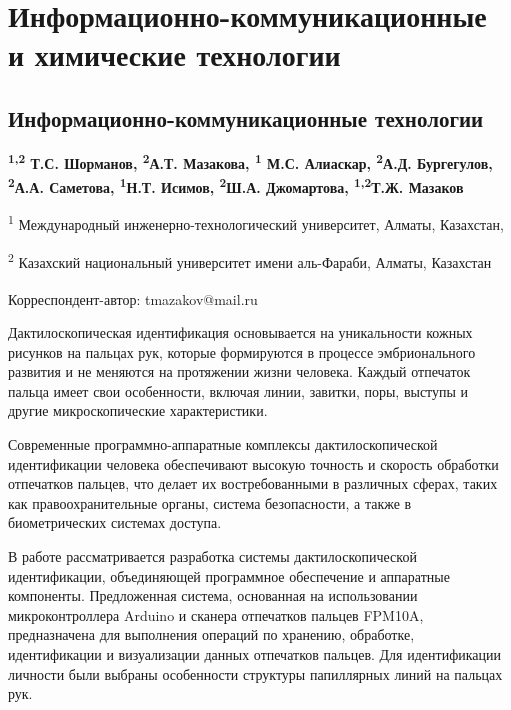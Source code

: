 \newpage
\let\cleardoublepage\clearpage
\part{Информационно-коммуникационные и химические технологии}
\chapter{Информационно-коммуникационные технологии}

\begin{articleheader}

{\bfseries \textsuperscript{1,2}
Т.С. Шорманов, \textsuperscript{2}А.Т.  Мазакова, \textsuperscript{1}
М.С. Алиаскар, \textsuperscript{2}А.Д.
Бургегулов, \textsuperscript{2}А.А. Саметова, \textsuperscript{1}Н.Т. Исимов, \textsuperscript{2}Ш.А.
Джомартова, \textsuperscript{1,2}Т.Ж. Мазаков\textsuperscript{\envelope }}
\end{articleheader}

\begin{affiliation}
\textsuperscript{1} Международный инженерно-технологический университет,
Алматы, Казахстан,

\textsuperscript{2} Казахский национальный университет имени аль-Фараби,
Алматы, Казахстан

\raggedright {\bfseries \textsuperscript{\envelope }}Корреспондент-автор: tmazakov@mail.ru
\end{affiliation}

Дактилоскопическая идентификация основывается на уникальности кожных
рисунков на пальцах рук, которые формируются в процессе эмбрионального
развития и не меняются на протяжении жизни человека. Каждый отпечаток
пальца имеет свои особенности, включая линии, завитки, поры, выступы и
другие микроскопические характеристики.

Современные программно-аппаратные комплексы дактилоскопической
идентификации человека обеспечивают высокую точность и скорость
обработки отпечатков пальцев, что делает их востребованными в различных
сферах, таких как правоохранительные органы, система безопасности, а
также в биометрических системах доступа.

В работе рассматривается разработка системы дактилоскопической
идентификации, объединяющей программное обеспечение и аппаратные
компоненты. Предложенная система, основанная на использовании
микроконтроллера Arduino и сканера отпечатков пальцев FPM10A,
предназначена для выполнения операций по хранению, обработке,
идентификации и визуализации данных отпечатков пальцев. Для
идентификации личности были выбраны особенности структуры папиллярных
линий на пальцах рук.

